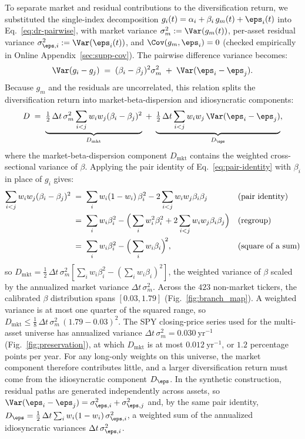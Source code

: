 To separate market and residual contributions to the diversification
return, we substituted the single-index decomposition
$g_i(t) = \alpha_i + \beta_i\, g_m(t) + \eps_i(t)$ into
Eq.~\eqref{eq:dr-pairwise}, with market variance
$\sigma_m^2 := \Var(g_m(t))$, per-asset residual variance
$\sigma_{\eps,i}^2 := \Var(\eps_i(t))$, and $\Cov(g_m, \eps_i) = 0$
(checked empirically in Online Appendix~\ref{sec:supp-cov}). The
pairwise difference variance becomes:
\begin{equation}
  \Var(g_i - g_j) \;=\; (\beta_i - \beta_j)^2 \sigma_m^2
  \;+\; \Var(\eps_i - \eps_j).
\end{equation}
Because $g_m$ and the residuals are uncorrelated, this relation splits
the diversification return into market-beta-dispersion and
idiosyncratic components:
\begin{equation}
  D \;=\;
  \underbrace{\tfrac{1}{2}\,\Delta t\,\sigma_m^2 \sum_{i<j} w_i w_j (\beta_i - \beta_j)^2}_{D_{\mathrm{mkt}}}
  \;+\;
  \underbrace{\tfrac{1}{2}\,\Delta t \sum_{i<j} w_i w_j \,\Var(\eps_i - \eps_j)}_{D_\eps},
  \label{eq:dr-sim}
\end{equation}
where the market-beta-dispersion component $D_\mathrm{mkt}$ contains
the weighted cross-sectional variance of $\beta$. Applying the pair
identity of Eq.~\eqref{eq:pair-identity} with $\beta_i$ in place of
$g_i$ gives:
\begin{align}
  \sum_{i<j} w_i w_j (\beta_i - \beta_j)^2
   &\;=\; \sum_i w_i (1 - w_i)\, \beta_i^2
     - 2 \sum_{i<j} w_i w_j \beta_i \beta_j
     && \text{(pair identity)} \notag \\
   &\;=\; \sum_i w_i \beta_i^2
     - \Big(\sum_i w_i^2 \beta_i^2
     + 2 \sum_{i<j} w_i w_j \beta_i \beta_j\Big)
     && \text{(regroup)} \notag \\
   &\;=\; \sum_i w_i \beta_i^2 - \Big(\sum_i w_i \beta_i\Big)^{\!2},
     && \text{(square of a sum)}
\end{align}
so $D_\mathrm{mkt} = \tfrac{1}{2}\,\Delta t\,\sigma_m^2 [\sum_i w_i
\beta_i^2 - (\sum_i w_i \beta_i)^2]$, the weighted variance of $\beta$
scaled by the annualized market variance $\Delta t\,\sigma_m^2$.
Across the $423$ non-market tickers, the calibrated $\beta$
distribution spans $[0.03, 1.79]$ (Fig.~\ref{fig:branch_map}). A
weighted variance is at most one quarter of the squared range, so
$D_{\mathrm{mkt}} \le \tfrac{1}{8}\,\Delta t\,\sigma_m^2\,(1.79 -
0.03)^2$. The SPY closing-price series used for the multi-asset
universe has annualized variance $\Delta t\,\sigma_m^2 =
0.030~\mathrm{yr}^{-1}$ (Fig.~\ref{fig:preservation}), at which
$D_{\mathrm{mkt}}$ is at most $0.012~\mathrm{yr}^{-1}$, or $1.2$
percentage points per year. For any long-only weights on this
universe, the market component therefore contributes little, and a
larger diversification return must come from the idiosyncratic
component $D_\eps$. In the synthetic construction, residual paths are
generated independently across assets, so
$\Var(\eps_i - \eps_j) = \sigma_{\eps,i}^2 + \sigma_{\eps,j}^2$ and,
by the same pair identity,
$D_\eps = \tfrac{1}{2}\,\Delta t \sum_i w_i (1 - w_i)\,
\sigma_{\eps,i}^2$, a weighted sum of the annualized idiosyncratic
variances $\Delta t\,\sigma_{\eps,i}^2$.

